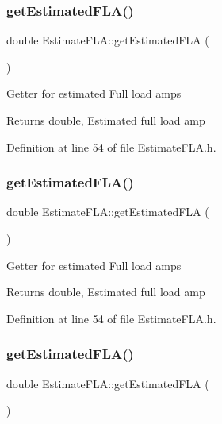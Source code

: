 \subsubsection{\texorpdfstring{get\+Estimated\+F\+L\+A()}{getEstimatedFLA()}\hspace{0.1cm}{\footnotesize\ttfamily [1/3]}}
{\footnotesize\ttfamily double Estimate\+F\+L\+A\+::get\+Estimated\+F\+LA (\begin{DoxyParamCaption}{ }\end{DoxyParamCaption})\hspace{0.3cm}{\ttfamily [inline]}}

Getter for estimated Full load amps \begin{DoxyReturn}{Returns}
double, Estimated full load amp 
\end{DoxyReturn}


Definition at line 54 of file Estimate\+F\+L\+A.\+h.

\mbox{\label{class_estimate_f_l_a_a84bebf788da566929b85d3deb8fd9755}} 
\subsubsection{\texorpdfstring{get\+Estimated\+F\+L\+A()}{getEstimatedFLA()}\hspace{0.1cm}{\footnotesize\ttfamily [2/3]}}
{\footnotesize\ttfamily double Estimate\+F\+L\+A\+::get\+Estimated\+F\+LA (\begin{DoxyParamCaption}{ }\end{DoxyParamCaption})\hspace{0.3cm}{\ttfamily [inline]}}

Getter for estimated Full load amps \begin{DoxyReturn}{Returns}
double, Estimated full load amp 
\end{DoxyReturn}


Definition at line 54 of file Estimate\+F\+L\+A.\+h.

\mbox{\label{class_estimate_f_l_a_a84bebf788da566929b85d3deb8fd9755}} 
\subsubsection{\texorpdfstring{get\+Estimated\+F\+L\+A()}{getEstimatedFLA()}\hspace{0.1cm}{\footnotesize\ttfamily [3/3]}}
{\footnotesize\ttfamily double Estimate\+F\+L\+A\+::get\+Estimated\+F\+LA (\begin{DoxyParamCaption}{ }\end{DoxyParamCaption})\hspace{0.3cm}{\ttfamily [inline]}}

